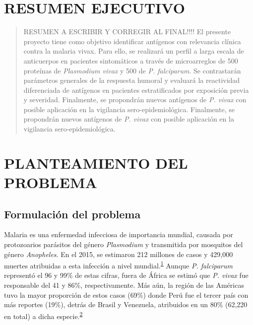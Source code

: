 \documentclass[]{article}
\begin{document}
\vfill
\restoregeometry
\clearpage

\newpage

\tableofcontents

\newpage


\section*{RESUMEN EJECUTIVO}\label{resumen-ejecutivo}

\begin{quote}
RESUMEN A ESCRIBIR Y CORREGIR AL FINAL!!!! El presente proyecto tiene
como objetivo identificar antígenos con relevancia clínica contra la
malaria vivax. Para ello, se realizará un perfil a larga escala de
anticuerpos en pacientes sintomáticos a través de microarreglos de 500
proteínas de \emph{Plasmodium vivax} y 500 de \emph{P. falciparum}. Se
contrastarán parámetros generales de la respuesta humoral y evaluará la
reactividad diferenciada de antígenos en pacientes estratificados por
exposición previa y severidad. Finalmente, se propondrán nuevos
antígenos de \emph{P. vivax} con posible aplicación en la vigilancia
sero-epidemiológica. Finalmente, se propondrán nuevos antígenos de
\emph{P. vivax} con posible aplicación en la vigilancia
sero-epidemiológica.
\end{quote}

\section{PLANTEAMIENTO DEL PROBLEMA}\label{planteamiento-del-problema}

\subsection{Formulación del problema}\label{intro}

Malaria es una enfermedad infecciosa de importancia mundial, causada por
protozoarios parásitos del género \emph{Plasmodium} y transmitida por
mosquitos del género \emph{Anopheles}. En el 2015, se estimaron 212
millones de casos y 429,000 muertes atribuidas a esta infección a nivel
mundial.\textsuperscript{\protect\hyperlink{ref-WHO2016world}{1}} Aunque
\emph{P. falciparum} representó el 96 y 99\% de estas cifras, fuera de
África se estimó que \emph{P. vivax} fue responsable del 41 y 86\%,
respectivamente. Más aún, la región de las Américas tuvo la mayor
proporción de estos casos (69\%) donde Perú fue el tercer país con más
reportes (19\%), detrás de Brasil y Venezuela, atribuidos en un 80\%
(62,220 en total) a dicha
especie.\textsuperscript{\protect\hyperlink{ref-rosas2016peru}{2}}
\end{document}
